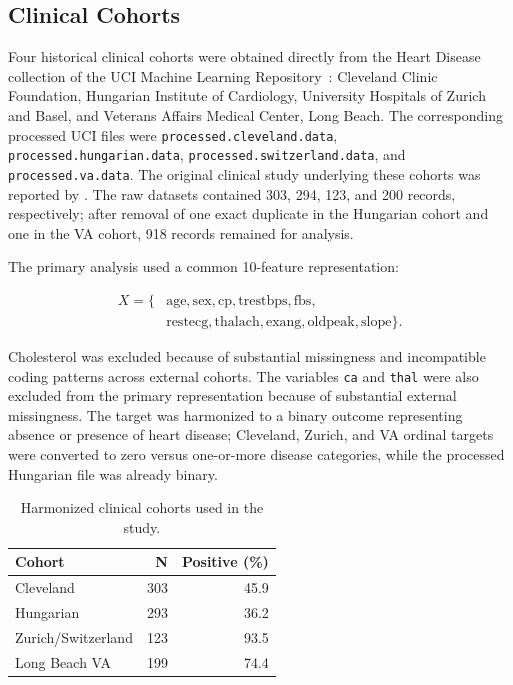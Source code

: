 \documentclass[10pt,journal,twocolumn]{IEEEtran}
\begin{document}
\subsection{Clinical Cohorts}

Four historical clinical cohorts were obtained directly from the Heart Disease collection of the UCI Machine Learning Repository~\parencite{uciheart}: Cleveland Clinic Foundation, Hungarian Institute of Cardiology, University Hospitals of Zurich and Basel, and Veterans Affairs Medical Center, Long Beach. The corresponding processed UCI files were \texttt{processed.cleveland.data}, \texttt{processed.hungarian.data}, \texttt{processed.switzerland.data}, and \texttt{processed.va.data}. The original clinical study underlying these cohorts was reported by \textcite{detrano1989}. The raw datasets contained 303, 294, 123, and 200 records, respectively; after removal of one exact duplicate in the Hungarian cohort and one in the VA cohort, 918 records remained for analysis.

The primary analysis used a common 10-feature representation:

\begin{equation}
\begin{aligned}
X = \{&
\mathrm{age},\mathrm{sex},\mathrm{cp},\mathrm{trestbps},\mathrm{fbs},\\
&\mathrm{restecg},\mathrm{thalach},\mathrm{exang},
\mathrm{oldpeak},\mathrm{slope}\}.
\end{aligned}
\label{eq:feature_set}
\end{equation}

Cholesterol was excluded because of substantial missingness and incompatible coding patterns across external cohorts. The variables \texttt{ca} and \texttt{thal} were also excluded from the primary representation because of substantial external missingness. The target was harmonized to a binary outcome representing absence or presence of heart disease; Cleveland, Zurich, and VA ordinal targets were converted to zero versus one-or-more disease categories, while the processed Hungarian file was already binary.

\begin{table}[!t]
\centering
\caption{Harmonized clinical cohorts used in the study.}
\label{tab:cohorts}
\small
\setlength{\tabcolsep}{10pt}
\begin{tabular}{lrr}
\toprule
\textbf{Cohort} & \textbf{N} & \textbf{Positive (\%)} \\
\midrule
Cleveland & 303 & 45.9 \\
Hungarian & 293 & 36.2 \\
Zurich/Switzerland & 123 & 93.5 \\
Long Beach VA & 199 & 74.4 \\
\bottomrule
\end{tabular}
\end{table}
\end{document}
